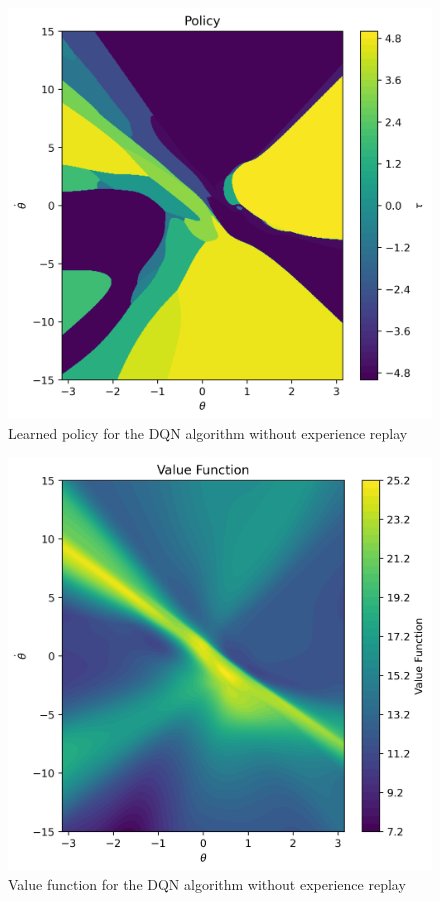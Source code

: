 \documentclass[conference]{IEEEtran}
\begin{document}
\begin{figure}[h]
\centering
\includegraphics[width=\linewidth]{../figures/yes_target_no_replay/ctr_policy_150_1000.png}
\caption{Learned policy for the DQN algorithm without experience replay}
\label{fig:yes_target_no_replay_policy}
\end{figure}
\begin{figure}[h]
\centering
\includegraphics[width=\linewidth]{../figures/yes_target_no_replay/ctr_value_func_150_1000.png}
\caption{Value function for the DQN algorithm without experience replay}
\label{fig:yes_target_no_replay_value_function}
\end{figure}
\end{document}
